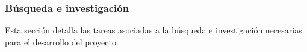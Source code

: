 \subsubsection{Búsqueda e investigación}\label{ssec:Descripción de las tareas}
Esta sección detalla las tareas asociadas a la búsqueda e investigación necesarias para el desarrollo del proyecto.